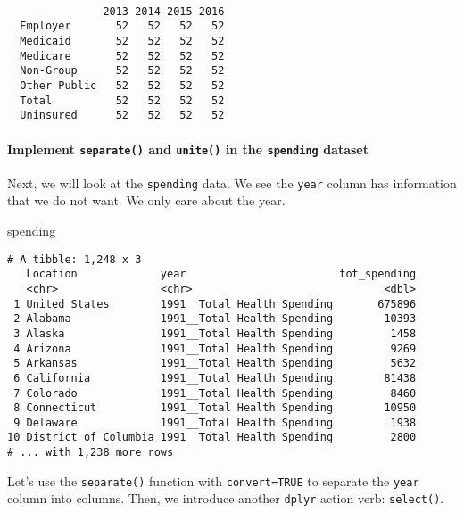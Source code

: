 \documentclass[]{article}
\newenvironment{Shaded}{\begin{snugshade}}{\end{snugshade}}
\newcommand{\NormalTok}[1]{#1}
\let\oldparagraph\paragraph
\renewcommand{\paragraph}[1]{\oldparagraph{#1}\mbox{}}
\begin{document}
\begin{verbatim}
              
               2013 2014 2015 2016
  Employer       52   52   52   52
  Medicaid       52   52   52   52
  Medicare       52   52   52   52
  Non-Group      52   52   52   52
  Other Public   52   52   52   52
  Total          52   52   52   52
  Uninsured      52   52   52   52
\end{verbatim}

\hypertarget{implement-separate-and-unite-in-the-spending-dataset}{%
\paragraph{\texorpdfstring{Implement \texttt{separate()} and
\texttt{unite()} in the \texttt{spending}
dataset}{Implement separate() and unite() in the spending dataset}}\label{implement-separate-and-unite-in-the-spending-dataset}}

Next, we will look at the \texttt{spending} data. We see the
\texttt{year} column has information that we do not want. We only care
about the year.

\begin{Shaded}
\begin{Highlighting}[]
\NormalTok{spending}
\end{Highlighting}
\end{Shaded}

\begin{verbatim}
# A tibble: 1,248 x 3
   Location             year                        tot_spending
   <chr>                <chr>                              <dbl>
 1 United States        1991__Total Health Spending       675896
 2 Alabama              1991__Total Health Spending        10393
 3 Alaska               1991__Total Health Spending         1458
 4 Arizona              1991__Total Health Spending         9269
 5 Arkansas             1991__Total Health Spending         5632
 6 California           1991__Total Health Spending        81438
 7 Colorado             1991__Total Health Spending         8460
 8 Connecticut          1991__Total Health Spending        10950
 9 Delaware             1991__Total Health Spending         1938
10 District of Columbia 1991__Total Health Spending         2800
# ... with 1,238 more rows
\end{verbatim}

Let's use the \texttt{separate()} function with \texttt{convert=TRUE} to
separate the \texttt{year} column into columns. Then, we introduce
another \texttt{dplyr} action verb: \texttt{select()}.
\end{document}

